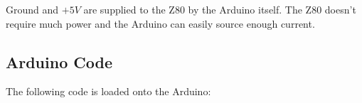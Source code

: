 Ground and $+5V$ are supplied to the Z80 by the Arduino itself. The Z80 doesn't require much power and the Arduino can easily source enough current.

\subsection{Arduino Code}
The following code is loaded onto the Arduino:

\lstset{numbers=left, frame=single, breaklines=true, basicstyle=\ttfamily\scriptsize}

